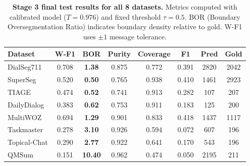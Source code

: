 \begin{table}[t]
\centering
\small
\begin{tabular}{lccccccc}
\toprule
Dataset & W-F1 & BOR & Purity & Coverage & F1 & Pred & Gold \\
\midrule
DialSeg711 & 0.708 & \textbf{1.38} & 0.875 & 0.772 & 0.391 & 2820 & 2042 \\
SuperSeg & 0.520 & \textbf{0.50} & 0.765 & 0.938 & 0.410 & 1461 & 2923 \\
TIAGE & 0.474 & \textbf{0.52} & 0.741 & 0.913 & 0.282 & 107 & 207 \\
DailyDialog & 0.383 & \textbf{0.62} & 0.753 & 0.911 & 0.183 & 125 & 200 \\
MultiWOZ & 0.694 & \textbf{1.29} & 0.901 & 0.833 & 0.418 & 1437 & 1117 \\
Taskmaster & 0.278 & \textbf{3.10} & 0.926 & 0.594 & 0.072 & 607 & 196 \\
Topical-Chat & 0.290 & \textbf{2.77} & 0.922 & 0.641 & 0.170 & 543 & 196 \\
QMSum & 0.151 & \textbf{10.40} & 0.962 & 0.474 & 0.050 & 2195 & 211 \\
\bottomrule
\end{tabular}
\caption{\textbf{Stage 3 final test results for all 8 datasets.}
Metrics computed with calibrated model ($T=0.976$) and fixed threshold $\tau=0.5$.
BOR (Boundary Oversegmentation Ratio) indicates boundary density relative to gold.
W-F1 uses $\pm 1$ message tolerance.}
\label{tab:stage3-all8}
\end{table}